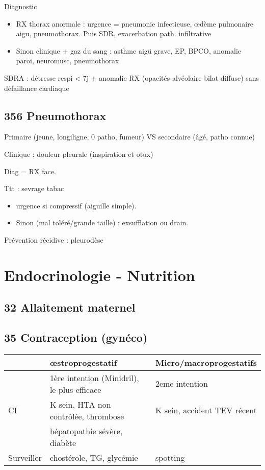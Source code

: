 \documentclass[11pt]{article}
\begin{document}
Diagnostic 
\begin{itemize}
\item RX thorax anormale : urgence = pneumonie infectieuse, \oe{}dème pulmonaire
aigu, pneumothorax. Puis SDR, exacerbation path. infiltrative
\item Sinon clinique + gaz du sang : asthme aigü grave, EP, BPCO, anomalie paroi,
neuromusc, pneumothorax
\end{itemize}

SDRA : détresse respi < 7j + anomalie RX (opacités alvéolaire bilat diffuse)
sans défaillance cardiaque
\subsection{356 Pneumothorax}
\label{sec:org1863220}
Primaire (jeune, longiligne, 0 patho, fumeur) VS secondaire (âgé, patho connue)

Clinique : douleur pleurale (\inc inspiration et otux)

Diag = RX face.

Ttt : sevrage tabac
\begin{itemize}
\item urgence si compressif (aiguille simple).
\item Sinon (mal toléré/grande taille) : exsufflation ou drain.
\end{itemize}

Prévention récidive : pleurodèse 

\section{Endocrinologie - Nutrition}
\label{sec:orgd7b8349}
\subsection{32 Allaitement maternel}
\label{sec:org60d5a16}
\subsection{35 Contraception (gynéco)}
\label{sec:org133e702}
\begin{center}
\begin{tabular}{lll}
 & \oe{}stroprogestatif & Micro/macroprogestatifs\\
\hline
 & 1ère intention (Minidril), le plus efficace & 2eme intention\\
CI & K sein, HTA non contrôlée, thrombose & K sein, accident TEV récent\\
 & hépatopathie sévère, diabète & \\
Surveiller & chostérole, TG, glycémie & spotting\\
\end{tabular}
\end{center}
\end{document}
